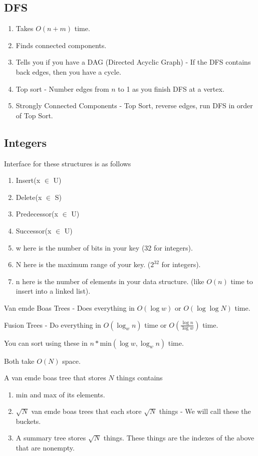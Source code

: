 \documentclass[12pt,twocolumn]{article}
\begin{document}
\subsection{DFS}
\begin{enumerate}
    \item Takes $O(n+m)$ time.
    \item Finds connected components.
    \item Tells you if you have a DAG (Directed Acyclic Graph) - If the DFS contains back edges, then you have a cycle.
    \item Top sort - Number edges from $n$ to 1 as you finish DFS at a vertex.
    \item Strongly Connected Components - Top Sort, reverse edges, run DFS in order of Top Sort.
\end{enumerate}

\subsection{Integers}

Interface for these structures is as follows
\begin{enumerate}
    \item Insert(x $\in$ U)
    \item Delete(x $\in$ S)
    \item Predecessor(x $\in$ U)
    \item Successor(x $\in$ U)
    \item w here is the number of bits in your key (32 for integers).
    \item N here is the maximum range of your key. ($2^{32}$ for integers).
    \item n here is the number of elements in your data structure. (like $O(n)$ time to insert into a linked list).
\end{enumerate}

Van emde Boas Trees - Does everything in $O(\log w)$ or $O(\log \log N)$ time.

Fusion Trees - Do everything in $O(\log_{w}{n})$ time or $O(\frac{\log{n}}{\log{w}})$ time.

You can sort using these in $n * $min$(\log w, \log_{w}{n})$ time.

Both take $O(N)$ space.

A van emde boas tree that stores $N$ things contains
\begin{enumerate}
    \item min and max of its elements.
    \item $\sqrt{N}$ van emde boas trees that each store $\sqrt{N}$ things - We will call these the buckets.
    \item A summary tree stores $\sqrt{N}$ things. These things are the indexes of the above that are nonempty.
\end{enumerate}
\end{document}
